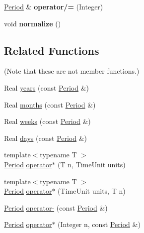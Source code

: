 \begin{DoxyCompactItemize}
\item 
\hypertarget{class_math_fin_1_1_period_a01eca33b6bf97ff12138fd11c2e34040}{}\hyperlink{class_math_fin_1_1_period}{Period} \& {\bfseries operator/=} (Integer)\label{class_math_fin_1_1_period_a01eca33b6bf97ff12138fd11c2e34040}

\item 
\hypertarget{class_math_fin_1_1_period_aff95bddc3a2cd2e8a0c0374c500d7c11}{}void {\bfseries normalize} ()\label{class_math_fin_1_1_period_aff95bddc3a2cd2e8a0c0374c500d7c11}

\end{DoxyCompactItemize}
\subsection*{Related Functions}
(Note that these are not member functions.) \begin{DoxyCompactItemize}
\item 
Real \hyperlink{class_math_fin_1_1_period_a06a4ee62bb93be97b4753ab5fa263f78}{years} (const \hyperlink{class_math_fin_1_1_period}{Period} \&)
\item 
Real \hyperlink{class_math_fin_1_1_period_a92a562ccbc1e5c902fd4bd4576bb12aa}{months} (const \hyperlink{class_math_fin_1_1_period}{Period} \&)
\item 
Real \hyperlink{class_math_fin_1_1_period_a81fdea029a8d7c598c96d298889d4b5d}{weeks} (const \hyperlink{class_math_fin_1_1_period}{Period} \&)
\item 
Real \hyperlink{class_math_fin_1_1_period_a4fe4dabf0407c1c808b1ca5a6f2b8c79}{days} (const \hyperlink{class_math_fin_1_1_period}{Period} \&)
\item 
{\footnotesize template$<$typename T $>$ }\\\hyperlink{class_math_fin_1_1_period}{Period} \hyperlink{class_math_fin_1_1_period_a34e24f3304fe9ac4e4228ec0aa5865e5}{operator$\ast$} (T n, Time\+Unit units)
\item 
{\footnotesize template$<$typename T $>$ }\\\hyperlink{class_math_fin_1_1_period}{Period} \hyperlink{class_math_fin_1_1_period_ae9caddf04a150ae3bab5c97d5a4d48ff}{operator$\ast$} (Time\+Unit units, T n)
\item 
\hyperlink{class_math_fin_1_1_period}{Period} \hyperlink{class_math_fin_1_1_period_a5fd528466f1b41de52d892efff387880}{operator-\/} (const \hyperlink{class_math_fin_1_1_period}{Period} \&)
\item 
\hyperlink{class_math_fin_1_1_period}{Period} \hyperlink{class_math_fin_1_1_period_a180303cf15f77ffa79f9b538d9d53585}{operator$\ast$} (Integer n, const \hyperlink{class_math_fin_1_1_period}{Period} \&)

\end{DoxyCompactItemize}
